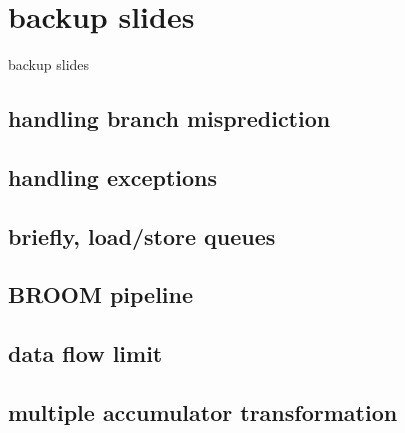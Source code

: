 
\section{backup slides}
\begin{frame}{backup slides}
\end{frame}

\subsection{handling branch misprediction}


\subsection{handling exceptions}
 

\subsection{briefly, load/store queues}

\subsection{BROOM pipeline}

\subsection{data flow limit}


\subsection{multiple accumulator transformation}

